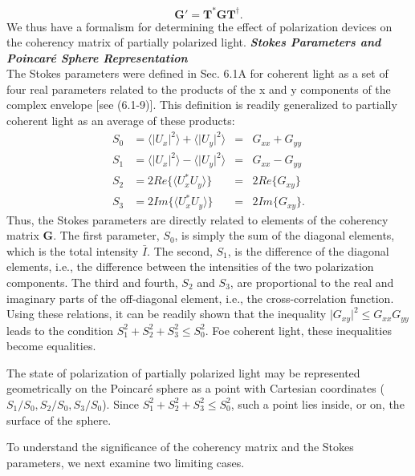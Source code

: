 \documentclass{article}
\numberwithin{figure}{subsection}
\numberwithin{table}{subsection}
\begin{document}
\begin{equation}
\mathbf{G' = T^\ast G T^\dag} .
\end{equation}
We thus have a formalism for determining the effect of polarization devices on the coherency matrix of partially polarized light.
\bigbreak\noindent\textcolor{ksc}{\textbf{\textsl{Stokes Parameters and Poincar\'{e} Sphere Representation}}}\\
The Stokes parameters were defined in Sec. 6.1A for coherent light as a set of four real parameters related to the products of the x and y components of the complex envelope [see (6.1-9)]. This definition is readily generalized to partially coherent light as an average of these products:
\begin{subequations}
\begin{alignat}{3}
S_0 &= \langle \lvert U_x \rvert^2 \rangle + \langle \lvert U_y \rvert^2 \rangle &=& G_{xx} + G_{yy} \\
S_1 &= \langle \lvert U_x \rvert^2 \rangle - \langle \lvert U_y \rvert^2 \rangle &= &G_{xx} - G_{yy} \\
S_2 &= 2Re\{\langle U_x^\ast U_y \rangle \} &=& 2Re\{G_{xy} \} \\
S_3 &= 2Im\{\langle U_x^\ast U_y \rangle \} &= &2Im\{G_{xy} \} .
\end{alignat}
\end{subequations} 
Thus, the Stokes parameters are directly related to elements of the coherency matrix $\mathbf{G}$. The first parameter, $S_0$, is simply the sum of the diagonal elements, which is the total intensity $\bar{I}$. The second, $S_1$, is the difference of the diagonal elements, i.e., the difference between the intensities of the two polarization components. The third and fourth, $S_2$ and $S_3$, are proportional to the real and imaginary parts of the off-diagonal element, i.e., the cross-correlation function. Using these relations, it can be readily shown that the inequality $\lvert G_{xy} \rvert^2 \leq G_{xx}G_{yy}$ leads to the condition $S_1^2 + S_2^2 + S_3^2 \leq S_0^2$. Foe coherent light, these inequalities become equalities.
\par The state of polarization of partially polarized light may be represented geometrically on the Poincar\'{e} sphere as a point with Cartesian coordinates ($S_1 / S_0, S_2 / S_0, S_3 / S_0$). Since $S_1^2 + S_2^2 + S_3^2 \leq S_0^2$, such a point lies inside, or on, the surface of the sphere.
\par To understand the significance of the coherency matrix and the Stokes parameters, we next examine two limiting cases.
\end{document}
